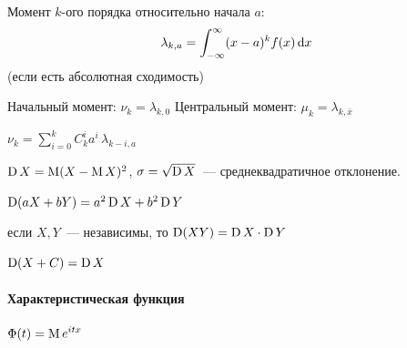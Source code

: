 \documentclass[12pt,timbord]{../../../notes}
\begin{document}
\begin{defn}\label{prop:prob::moments::mom}
  Момент $k$-ого порядка относительно начала $a$:
  \[
    \lambda_{k,a} = \int_{-\infty}^{\infty} (x-a)^k f(x)\, \mathrm{d} x
  \]
  (если есть абсолютная сходимость)
\end{defn}
{\label{defn:prob::moments::zer} Начальный  момент: {$\nu_k =\lambda_{k,0}$}}
{\label{defn:prob::moments::cen} Центральный  момент: {$\mu_k =\lambda_{k,\bar x}$}}

{\prop\label{prop:prob::moments::conn} $\displaystyle\nu_k=\sum_{i=0}^k C_k^i a^i \,\lambda_{k-i,a}$}

\begin{defn}[Дисперсия]\label{defn:prob::moments::var}
  $\operatorname{D} X = \operatorname{M} (X-\operatorname{M} X)^2$, $\sigma = \sqrt{\operatorname{D} X}$~--- среднеквадратичное отклонение.
\end{defn}

\begin{prop}\label{prop:prob::moments::varprop}
  \item $\operatorname{D}(a X + b Y) = a^2 \operatorname{D} X + b^2 \operatorname{D} Y$
  \item если $X,Y$~--- независимы, то $\operatorname{D} (XY) = \operatorname{D} X \cdot \operatorname{D} Y$
  \item $\operatorname{D}(X+C) = \operatorname{D} X$
\end{prop}

\paragraph{Характеристическая функция}
\label{par:prop::charfun}

\begin{defn}\label{defn:prob::moments::charfun}
  $\displaystyle \Phi(t) = \operatorname{M} e^{itx}$
\end{defn}
\end{document}
